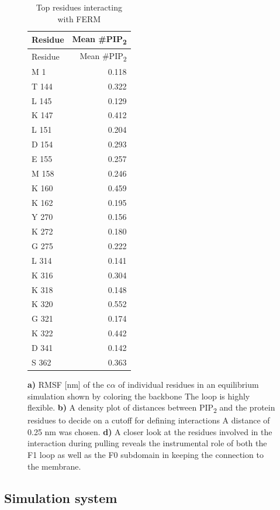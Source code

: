 \documentclass[
  letterpaper,
  DIV=11,
  numbers=noendperiod]{scrartcl}
\begin{document}
\begin{figure}
\begin{minipage}[t]{0.33\linewidth}
{\begin{longtable}[]{@{}lr@{}}
\caption{\label{tbl-ferm-top-interacting}Top residues interacting with
FERM}\tabularnewline
\toprule
Residue & Mean \#PIP\textsubscript{2} \\
\midrule
\endfirsthead
\toprule
Residue & Mean \#PIP\textsubscript{2} \\
\midrule
\endhead
M 1 & 0.118 \\
T 144 & 0.322 \\
L 145 & 0.129 \\
K 147 & 0.412 \\
L 151 & 0.204 \\
D 154 & 0.293 \\
E 155 & 0.257 \\
M 158 & 0.246 \\
K 160 & 0.459 \\
K 162 & 0.195 \\
Y 270 & 0.156 \\
K 272 & 0.180 \\
G 275 & 0.222 \\
L 314 & 0.141 \\
K 316 & 0.304 \\
K 318 & 0.148 \\
K 320 & 0.552 \\
G 321 & 0.174 \\
K 322 & 0.442 \\
D 341 & 0.142 \\
S 362 & 0.363 \\
\bottomrule
\end{longtable}

}

\end{minipage}%

\caption{\label{fig-suppl}\textbf{a)} RMSF {[}nm{]} of the c\(\alpha\)
of individual residues in an equilibrium simulation shown by coloring
the backbone The loop is highly flexible. \textbf{b)} A density plot of
distances between PIP\textsubscript{2} and the protein residues to
decide on a cutoff for defining interactions A distance of 0.25 nm was
chosen. \textbf{d)} A closer look at the residues involved in the
interaction during pulling reveals the instrumental role of both the F1
loop as well as the F0 subdomain in keeping the connection to the
membrane.}

\end{figure}

\hypertarget{sec-system}{%
\subsection{Simulation system}\label{sec-system}}
\end{document}
